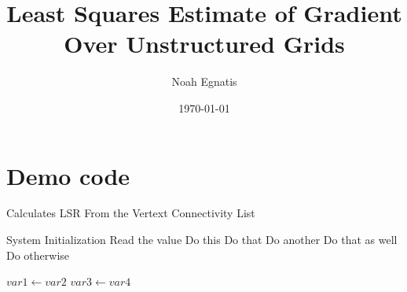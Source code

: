 \documentclass[a4paper]{article}
\title{Least Squares Estimate of Gradient Over Unstructured Grids}
\author{Noah Egnatis}
\date{\today}    %
\begin{document}
\maketitle
\section{Demo code}

\begin{algorithm}
\caption{Calculates LSR From the Vertext Connectivity List}
\begin{algorithmic}[1]

       
    \State System Initialization
    \State Read the value 
        \State Do this
        \State Do that
        \State Do another
        \State Do that as well
        \Else
        \State Do otherwise
        \EndIf
    \EndIf

      
        \State $var1 \leftarrow var2$  
        \State $var3 \leftarrow var4$
    \EndWhile  \label{roy's loop}
\EndProcedure

\end{algorithmic}
\end{algorithm}
\end{document}

